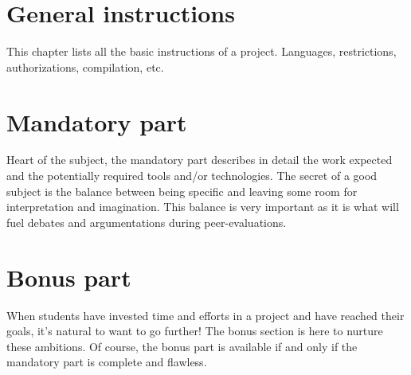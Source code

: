 \documentclass{42-en}
\begin{document}
\chapter{General instructions}

    This chapter lists all the basic instructions of a project.
    Languages, restrictions, authorizations, compilation, etc.



\chapter{Mandatory part}

    Heart of the subject, the mandatory part describes in detail the
    work expected and the potentially required tools and/or technologies.
    The secret of a good subject is the balance between
    being specific and leaving some room for interpretation and
    imagination. This balance is very important as it is what will
    fuel debates and argumentations during peer-evaluations.



\chapter{Bonus part}

    When students have invested time and efforts in a project and have reached
    their goals, it's natural to want to go further! The bonus section
    is here to nurture these ambitions. Of course, the bonus part is
    available if and only if the mandatory part is complete and flawless.
\end{document}
